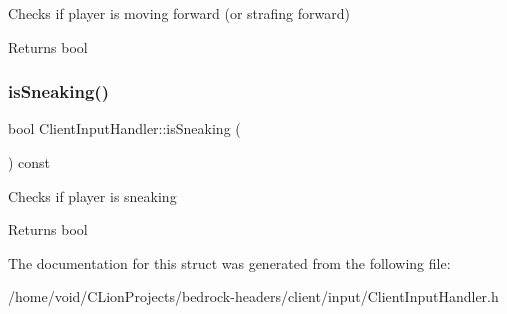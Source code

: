 Checks if player is moving forward (or strafing forward) \begin{DoxyReturn}{Returns}
bool 
\end{DoxyReturn}
\mbox{\label{struct_client_input_handler_aaa32573b74b0fa24437c2a3b4d56c0b8}} 
\subsubsection{\texorpdfstring{isSneaking()}{isSneaking()}}
{\footnotesize\ttfamily bool Client\+Input\+Handler\+::is\+Sneaking (\begin{DoxyParamCaption}{ }\end{DoxyParamCaption}) const}

Checks if player is sneaking \begin{DoxyReturn}{Returns}
bool 
\end{DoxyReturn}


The documentation for this struct was generated from the following file\+:\begin{DoxyCompactItemize}
\item 
/home/void/\+C\+Lion\+Projects/bedrock-\/headers/client/input/Client\+Input\+Handler.\+h\end{DoxyCompactItemize}
